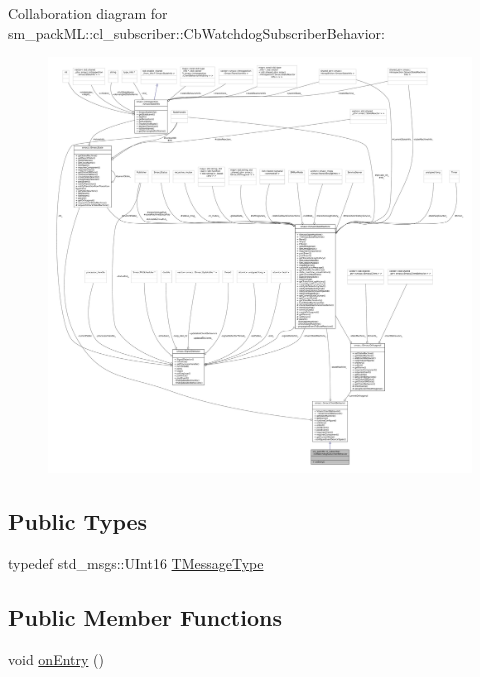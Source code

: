 Collaboration diagram for sm\+\_\+pack\+ML\+:\+:cl\+\_\+subscriber\+:\+:Cb\+Watchdog\+Subscriber\+Behavior\+:
\nopagebreak
\begin{figure}[H]
\begin{center}
\leavevmode
\includegraphics[width=350pt]{classsm__packML_1_1cl__subscriber_1_1CbWatchdogSubscriberBehavior__coll__graph}
\end{center}
\end{figure}
\subsection*{Public Types}
\begin{DoxyCompactItemize}
\item 
typedef std\+\_\+msgs\+::\+U\+Int16 \hyperlink{classsm__packML_1_1cl__subscriber_1_1CbWatchdogSubscriberBehavior_a4c2c498b391327db2667769c6de6b8da}{T\+Message\+Type}
\end{DoxyCompactItemize}
\subsection*{Public Member Functions}
\begin{DoxyCompactItemize}
\item 
void \hyperlink{classsm__packML_1_1cl__subscriber_1_1CbWatchdogSubscriberBehavior_ab6c7d5b7f24bdb3292eac8071a384ee9}{on\+Entry} ()
\end{DoxyCompactItemize}


